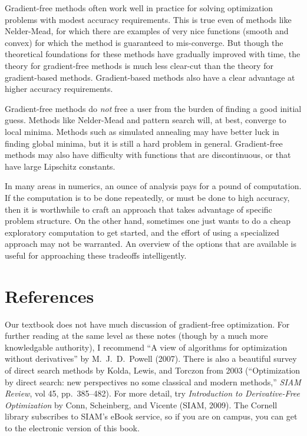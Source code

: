 \documentclass[12pt, leqno]{article} %
\begin{document}
Gradient-free methods often work well in practice for solving
optimization problems with modest accuracy requirements.  This is true
even of methods like Nelder-Mead, for which there are examples of very
nice functions (smooth and convex) for which the method is guaranteed
to mis-converge.  But though the theoretical foundations for these
methods have gradually improved with time, the theory for
gradient-free methods is much less clear-cut than the theory for
gradient-based methods.  Gradient-based methods also have a clear
advantage at higher accuracy requirements.

Gradient-free methods do {\em not} free a user from the burden of
finding a good initial guess.  Methods like Nelder-Mead and pattern
search will, at best, converge to local minima.  Methods such as
simulated annealing may have better luck in finding global minima,
but it is still a hard problem in general.  Gradient-free methods may
also have difficulty with functions that are discontinuous, or that
have large Lipschitz constants.

In many areas in numerics, an ounce of analysis pays for a pound of
computation.  If the computation is to be done repeatedly, or must be
done to high accuracy, then it is worthwhile to craft an approach that
takes advantage of specific problem structure.  On the other hand,
sometimes one just wants to do a cheap exploratory computation to
get started, and the effort of using a specialized approach may not
be warranted.  An overview of the options that are available is
useful for approaching these tradeoffs intelligently.

\section*{References}

Our textbook does not have much discussion of gradient-free
optimization.  For further reading at the same level as these notes
(though by a much more knowledgable authority), I recommend ``A view
of algorithms for optimization without derivatives'' by
M.~J.~D.~Powell (2007).  There is also a beautiful survey of direct
search methods by Kolda, Lewis, and Torczon from 2003 (``Optimization
by direct search: new perspectives no some classical and modern
methods,'' {\em SIAM Review}, vol 45, pp.~385--482).
For more detail, try {\em Introduction to
  Derivative-Free Optimization} by Conn, Scheinberg, and Vicente
(SIAM, 2009).  The Cornell library subscribes to SIAM's eBook service,
so if you are on campus, you can get to the electronic version of this
book.
\end{document}
